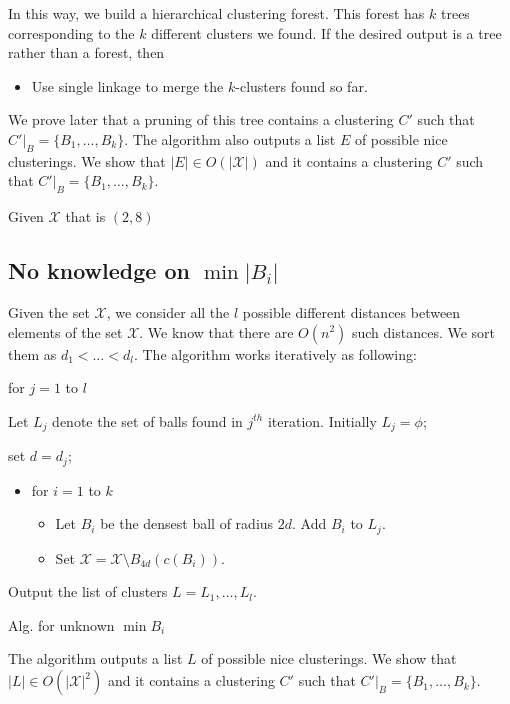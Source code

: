 \documentclass[11pt]{article}
\newenvironment{alg}{
    \begin{list}{}{
        \setlength{\itemsep}{2pt}
        \setlength{\parsep}{0pt}
        \setlength{\parskip}{0pt}
        \setlength{\topsep}{1pt}
    }
}
{
    \end{list}
}
\begin{document}
\noindent In this way, we build a hierarchical clustering forest. This forest has $k$ trees corresponding to the $k$ different clusters we found. If the desired output is a tree rather than a forest, then 
\begin{itemize}
\item Use single linkage to merge the $k$-clusters found so far. 
\end{itemize}

We prove later that a pruning of this tree contains a clustering $C'$ such that $C'|_B = \{B_1,\ldots,B_k\}$. The algorithm also outputs a list $E$ of possible nice clusterings. We show that $|E| \in O(|\mathcal{X}|)$ and it contains a clustering $C'$ such that $C'|_B = \{B_1,\ldots,B_k\}$.

\begin{theorem}
Given $\mathcal{X}$ that is $(2,8)$
\end{theorem}

\subsection{No knowledge on $\min |B_i|$ }

Given the set $\mathcal{X}$,
we consider all the $l$ possible different distances between elements of the set $\mathcal{X}$. We know that there are $O(n^2)$ such distances. We sort them as $d_1<\ldots<d_l$. The algorithm works iteratively as following:


\begin{algorithm}
\begin{alg}
\label{NotKnown}

\item[] for $j=1$ to $l$
\item[] Let $L_j$ denote the set of balls found in $j^{th}$ iteration. Initially $L_j=\phi$;
\item[] set $d=d_j$;

\begin{itemize}

\item[] for $i=1$ to $k$

\begin{itemize}

\item[] Let $B_i$ be the densest ball of radius $2d$. Add $B_i$ to $L_j$.
\item[] Set $\mathcal{X}=\mathcal{X}\setminus B_{4d}(c(B_i))$. 

\end{itemize}

\end{itemize}

Output the list of clusters $L={L_1,\ldots,L_l}$.
\end{alg}
\caption{Alg. for unknown $\min{B_i}$}
\end{algorithm}

\noindent The algorithm outputs a list $L$ of possible nice clusterings. We show that $|L| \in O(|\mathcal{X}|^2)$ and it contains a clustering $C'$ such that $C'|_B = \{B_1,\ldots,B_k\}$.
\end{document}
